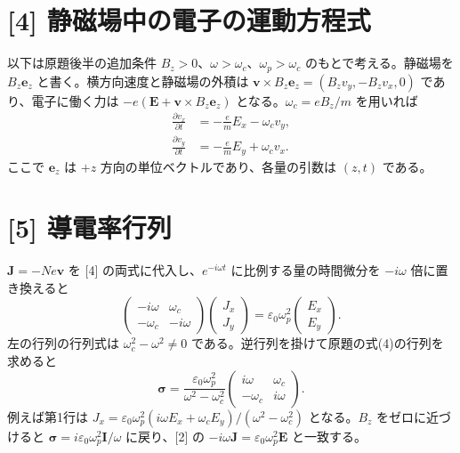 \documentclass[11pt,a4paper]{article}
\begin{document}
\section*{[4] 静磁場中の電子の運動方程式}
以下は原題後半の追加条件 $B_z>0$、$\omega>\omega_c$、$\omega_p>\omega_c$ のもとで考える。静磁場を $B_z\boldsymbol e_z$ と書く。横方向速度と静磁場の外積は $\boldsymbol v\times B_z\boldsymbol e_z=(B_zv_y,-B_zv_x,0)$ であり、電子に働く力は $-e(\boldsymbol E+\boldsymbol v\times B_z\boldsymbol e_z)$ となる。$\omega_c=eB_z/m$ を用いれば
\[
\boxed{\begin{aligned}
\frac{\partial v_x}{\partial t}&=-\frac em E_x-\omega_c v_y,\\
\frac{\partial v_y}{\partial t}&=-\frac em E_y+\omega_c v_x.
\end{aligned}}
\]
ここで $\boldsymbol e_z$ は $+z$ 方向の単位ベクトルであり、各量の引数は $(z,t)$ である。

\section*{[5] 導電率行列}
$\boldsymbol J=-Ne\boldsymbol v$ を [4] の両式に代入し、$e^{-i\omega t}$ に比例する量の時間微分を $-i\omega$ 倍に置き換えると
\[
\begin{pmatrix}-i\omega&\omega_c\\-\omega_c&-i\omega\end{pmatrix}
\begin{pmatrix}J_x\\J_y\end{pmatrix}
=\varepsilon_0\omega_p^2
\begin{pmatrix}E_x\\E_y\end{pmatrix}.
\]
左の行列の行列式は $\omega_c^2-\omega^2\ne0$ である。逆行列を掛けて原題の式(4)の行列を求めると
\[
\boxed{\boldsymbol\sigma
=\frac{\varepsilon_0\omega_p^2}{\omega^2-\omega_c^2}
\begin{pmatrix}i\omega&\omega_c\\-\omega_c&i\omega\end{pmatrix}.}
\]
例えば第1行は $J_x=\varepsilon_0\omega_p^2(i\omega E_x+\omega_c E_y)/(\omega^2-\omega_c^2)$ となる。$B_z$ をゼロに近づけると $\boldsymbol\sigma=i\varepsilon_0\omega_p^2\mathbf I/\omega$ に戻り、[2] の $-i\omega\boldsymbol J=\varepsilon_0\omega_p^2\boldsymbol E$ と一致する。
\end{document}
